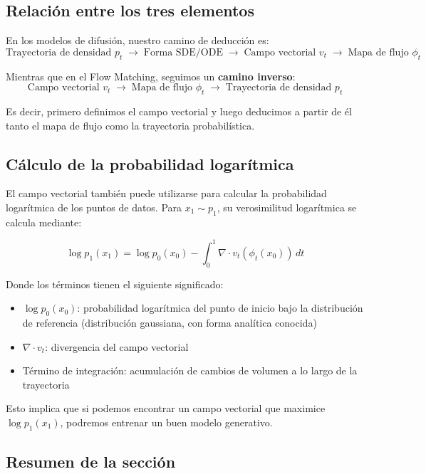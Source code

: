 \documentclass[a4paper]{article}
\begin{document}
\subsection{Relación entre los tres elementos}

En los modelos de difusión, nuestro camino de deducción es:
$$\text{Trayectoria de densidad } p_t \;\longrightarrow\; \text{Forma SDE/ODE} \;\longrightarrow\; \text{Campo vectorial } v_t \;\longrightarrow\; \text{Mapa de flujo } \phi_t$$

Mientras que en el Flow Matching, seguimos un \textbf{camino inverso}:
$$\text{Campo vectorial } v_t \;\longrightarrow\; \text{Mapa de flujo } \phi_t \;\longrightarrow\; \text{Trayectoria de densidad } p_t$$

Es decir, primero definimos el campo vectorial y luego deducimos a partir de él tanto el mapa de flujo como la trayectoria probabilística.

\subsection{Cálculo de la probabilidad logarítmica}

El campo vectorial también puede utilizarse para calcular la probabilidad logarítmica de los puntos de datos. Para $x_1 \sim p_1$, su verosimilitud logarítmica se calcula mediante:

$$\log p_1(x_1) = \log p_0(x_0) - \int_0^1 \nabla \cdot v_t(\phi_t(x_0)) \, dt$$

Donde los términos tienen el siguiente significado:
\begin{itemize}
    \item $\log p_0(x_0)$: probabilidad logarítmica del punto de inicio bajo la distribución de referencia (distribución gaussiana, con forma analítica conocida)
    \item $\nabla \cdot v_t$: divergencia del campo vectorial
    \item Término de integración: acumulación de cambios de volumen a lo largo de la trayectoria
\end{itemize}

Esto implica que si podemos encontrar un campo vectorial que maximice $\log p_1(x_1)$, podremos entrenar un buen modelo generativo.

\subsection{Resumen de la sección}
\end{document}
